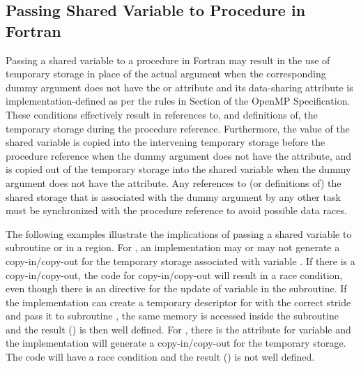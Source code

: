 \pagebreak
\begin{fortranspecific}[4ex]
\section{Passing Shared Variable to Procedure in Fortran}
\label{sec:fort_shared_var}

Passing a shared variable to a procedure in Fortran may result in the use of
temporary storage in place of the actual argument when the corresponding dummy 
argument does not have the  or  attribute and 
its data-sharing attribute is implementation-defined as per the rules in 
Section  of
the OpenMP Specification. 
These conditions effectively result in references to, and definitions of, the 
temporary storage during the procedure reference. Furthermore, the value of the 
shared variable is copied into the intervening temporary storage before the 
procedure reference when the dummy argument does not have the 
 attribute, and is copied out of the temporary storage into 
the shared variable when the dummy argument does not have the 
 attribute. Any references to (or definitions of) the shared 
storage that is associated with the dummy argument by any other task must be 
synchronized with the procedure reference to avoid possible data races.

The following examples illustrate the implications of passing a shared 
variable  to subroutine  or  in
a  region.
For , an implementation may or may not generate a copy-in/copy-out 
for the temporary storage associated with variable . 
If there is a copy-in/copy-out, the code for copy-in/copy-out will result in 
a race condition, even though there is an 
directive for the update of variable  in the subroutine. 
If the implementation can create a temporary descriptor for  
with the correct stride and pass it to subroutine , 
the same memory is accessed inside the subroutine and the result 
() is then well defined.
For , there is the  attribute for 
variable  and the implementation will generate a copy-in/copy-out 
for the temporary storage.
The code will have a race condition and the result () is
not well defined.

\end{fortranspecific}

